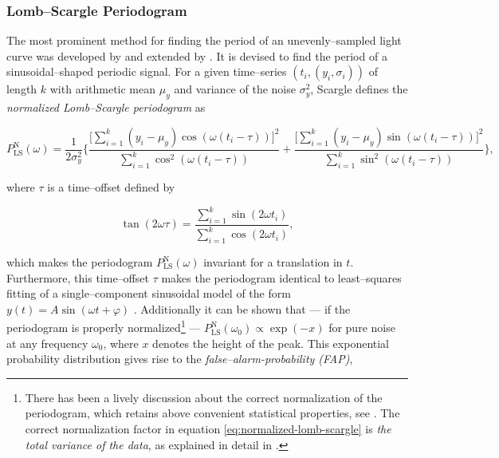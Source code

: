 \subsubsection{Lomb--Scargle Periodogram}
\label{subsubsec:lomb-scargle}

The most prominent method for finding the period of an unevenly--sampled light curve was developed by \citet{lomb1976} and extended by \citet{scargle1982}. It is devised to find the period of a sinusoidal--shaped periodic signal. For a given time--series $(t_i, (y_i, \sigma_i))$ of length $k$ with arithmetic mean $\mu_y$ and variance of the noise $\sigma_y^2$, Scargle defines the \emph{normalized Lomb--Scargle periodogram} as

\begin{equation}
\label{eq:normalized-lomb-scargle}
P^{\text{N}}_{\text{LS}}(\omega) = \frac{1}{2 \sigma_y^2} \Bigg\{ \frac{\big[\sum\limits_{i=1}^k (y_i - \mu_y) \cos(\omega(t_i - \tau))\big]^2}{\sum\limits_{i=1}^k \cos^2(\omega(t_i - \tau))} + \frac{\big[\sum\limits_{i=1}^k (y_i - \mu_y) \sin(\omega(t_i - \tau))\big]^2}{\sum\limits_{i=1}^k \sin^2(\omega(t_i - \tau))}\Bigg\},
\end{equation}

where $\tau$ is a time--offset defined by

\begin{equation}
\tan(2 \omega \tau) = \frac{\sum\limits_{i=1}^k \sin(2 \omega t_i)}{\sum\limits_{i=1}^k \cos(2 \omega t_i)},
\end{equation}

which makes the periodogram $P^{\text{N}}_{\text{LS}}(\omega)$ invariant for a translation in $t$. Furthermore, this time--offset $\tau$ makes the periodogram identical to least--squares fitting of a single--component sinusoidal model of the form $y(t) = A \sin(\omega t + \varphi)$ \citep{horne1986, vanderplas2015}. Additionally it can be shown that --- if the periodogram is properly normalized\footnote{There has been a lively discussion about the correct normalization of the periodogram, which retains above convenient statistical properties, see \citet{lomb1976,astroML,zechmeister2009}. The correct normalization factor in equation \eqref{eq:normalized-lomb-scargle} is \emph{the total variance of the data}, as explained in detail in \citet{horne1986}.} --- $P^{\text{N}}_{\text{LS}}(\omega_0) \propto \exp(-x)$ for pure noise at any frequency $\omega_0$, where $x$ denotes the height of the peak. This exponential probability distribution gives rise to the \emph{false--alarm-probability (FAP)},

